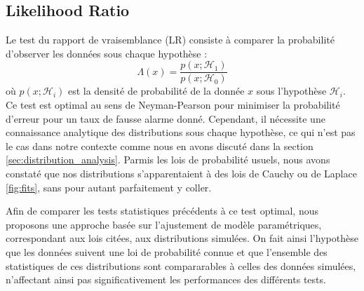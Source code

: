 \documentclass{article}
\begin{document}
\subsection{Likelihood Ratio}
Le test du rapport de vraisemblance (LR) consiste à comparer la probabilité d'observer les données sous chaque hypothèse :
\begin{equation}
    \Lambda(x) = \frac{p(x;\mathcal{H}_1)}{p(x;\mathcal{H}_0)}
\end{equation}
où $p(x;\mathcal{H}_i)$ est la densité de probabilité de la donnée $x$ sous l'hypothèse $\mathcal{H}_i$. Ce test est optimal au sens de Neyman-Pearson pour minimiser la probabilité d'erreur pour un taux de fausse alarme donné. Cependant, il nécessite une connaissance analytique des distributions sous chaque hypothèse, ce qui n'est pas le cas dans notre contexte comme nous en avons discuté dans la section \ref{sec:distribution_analysis}. Parmis les lois de probabilité usuels, nous avons constaté que nos distributions s'apparentaient à des lois de Cauchy ou de Laplace \ref{fig:fits}, sans pour autant parfaitement y coller.

 Afin de comparer les tests statistiques précédents à ce test optimal, nous proposons une approche basée sur l'ajustement de modèle paramétriques, correspondant aux lois citées, aux distributions simulées. On fait ainsi l'hypothèse que les données suivent une loi de probabilité connue et que l'ensemble des statistiques de ces distributions sont compararables à celles des données simulées, n'affectant ainsi pas significativement les performances des différents tests.
\end{document}
